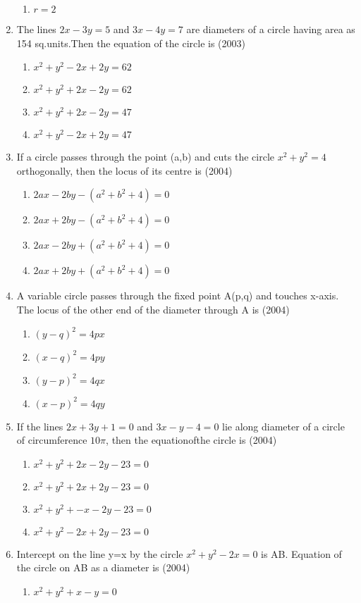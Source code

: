 \documentclass[12pt]{article}
\begin{document}
\begin{enumerate}
\begin{enumerate}
\item $r=2$
\end{enumerate}
\item The lines $2x-3y=5$ and $3x-4y=7$ are diameters of a circle having area as 154 sq.units.Then the equation of the circle is (2003)
\begin{enumerate}
\item $x^2+y^2-2x+2y=62$ 
\item $x^2+y^2+2x-2y=62$
\item $x^2+y^2+2x-2y=47$ 
\item $x^2+y^2-2x+2y=47$
\end{enumerate}
\item If a circle passes through the point (a,b) and cuts the circle $x^2+y^2=4$ orthogonally, then the locus of its centre is (2004)
\begin{enumerate}
\item $2ax-2by-(a^2+b^2+4)=0$
\item $2ax+2by-(a^2+b^2+4)=0$
\item $2ax-2by+(a^2+b^2+4)=0$
\item $2ax+2by+(a^2+b^2+4)=0$
\end{enumerate}
\item A variable circle passes through the fixed point A(p,q) and touches x-axis. The locus of the other end of the diameter through A is (2004)
\begin{enumerate}
\item $(y-q)^2=4px$
\item $(x-q)^2=4py$
\item $(y-p)^2=4qx$
\item $(x-p)^2=4qy$
\end{enumerate}
\item If the lines $2x+3y+1=0$ and $3x-y-4=0$ lie along diameter of a circle of circumference $10\pi$, then the equationofthe circle is (2004)
\begin{enumerate}
\item $x^2+y^2+2x-2y-23=0$
\item $x^2+y^2+2x+2y-23=0$
\item $x^2+y^2+-x-2y-23=0$
\item $x^2+y^2-2x+2y-23=0$
\end{enumerate}
\item Intercept on the line y=x by the circle $x^2+y^2-2x=0$ is AB. Equation of the circle on AB as a diameter is (2004)
\begin{enumerate}
\item  $x^2+y^2+x-y=0$

\end{enumerate}
\end{enumerate}
\end{document}
